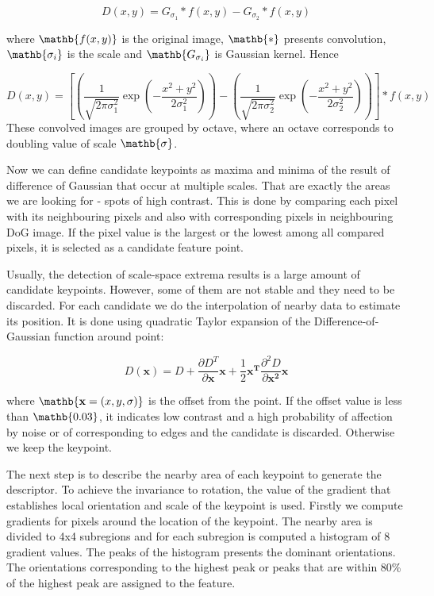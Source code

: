 \[ D(x, y) = G_{\sigma_1} * f(x, y) - G_{\sigma_2} * f(x, y) \]


where $\mathb{f(x, y)}$ is the original image, $\mathb{*}$ presents convolution, $\mathb{\sigma_i}$ is the scale and $\mathb{G_{\sigma_i}}$ is Gaussian kernel. Hence
\pagebreak

\[
D(x, y) = 
\left[
\left( \frac{1}{\sqrt{2\pi \sigma _1^{2}}}\exp\left ( -\frac{x^{2}+y^{2}}{2\sigma_1^{2}} \right ) \right) -
\left( \frac{1}{\sqrt{2\pi \sigma _2^{2}}}\exp\left ( -\frac{x^{2}+y^{2}}{2\sigma_2^{2}} \right ) \right )
 \right ] * f(x, y)
\]
These convolved images are grouped by octave, where an octave corresponds to doubling value of scale $\mathb{\sigma}$.


Now we can define candidate keypoints as maxima and minima of the result of difference of Gaussian that occur at multiple scales.
That are exactly the areas we are looking for -  spots of high contrast.
This is done by comparing each pixel with its neighbouring pixels and also with corresponding pixels in neighbouring DoG image. 
If the pixel value is the largest or the lowest among all compared pixels, it is selected as a candidate feature point.

Usually, the detection of scale-space extrema results is a large amount of candidate keypoints.
However, some of them are not stable and they need to be discarded.
For each candidate we do the interpolation of nearby data to estimate its position.
It is done using quadratic Taylor expansion of the Difference-of-Gaussian function around point:

\[
D(\mathbf{x}) = D + \frac{\partial D^{T}}{\partial \mathbf{x}}\mathbf{x} + \frac{1}{2}\mathbf{x^{T}}\frac{\partial ^{2}D}{\partial \mathbf{x^{2}}}\mathbf{x}
\]

where $\mathb{\mathbf{x} = (x, y, \sigma)}$ is the offset from the point.
If the offset value is less than $\mathb{0.03}$, it indicates low contrast and a high probability of affection by noise or of corresponding to edges and the candidate is discarded.
Otherwise we keep the keypoint.

The next step is to describe the nearby area of each keypoint to generate the descriptor. 
To achieve the invariance to rotation, the value of the gradient that establishes local orientation and scale of the keypoint is used.
Firstly we compute gradients for pixels around the location of the keypoint.
The nearby area is divided to 4x4 subregions and for each subregion is computed a histogram of 8 gradient values.
The peaks of the histogram presents the dominant orientations.
The orientations corresponding to the highest peak or peaks that are within 80\% of the highest peak are assigned to the feature.

